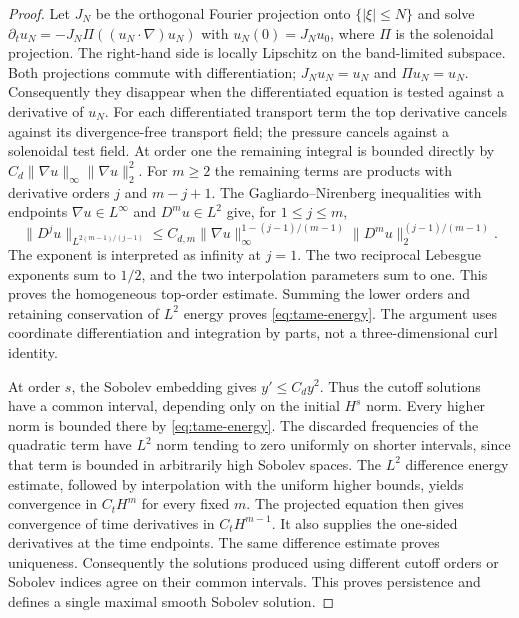 \begin{proof}
Let $J_N$ be the orthogonal Fourier projection onto $\{|\xi|\le N\}$
and solve
$\partial_tu_N=-J_N\Pi((u_N\cdot\nabla)u_N)$ with
$u_N(0)=J_Nu_0$, where $\Pi$ is the solenoidal projection.
The right-hand side is locally Lipschitz on the band-limited subspace.
Both projections commute with differentiation; $J_Nu_N=u_N$ and
$\Pi u_N=u_N$. Consequently they disappear when the differentiated
equation is tested against a derivative of $u_N$. For each differentiated
transport term the top derivative cancels against its divergence-free
transport field; the pressure cancels against a solenoidal test field.
At order one the remaining integral is bounded directly by
$C_d\|\nabla u\|_\infty\|\nabla u\|_2^2$. For $m\geq2$ the
remaining terms are products with derivative orders $j$ and $m-j+1$. The Gagliardo--Nirenberg inequalities with endpoints
$\nabla u\in L^\infty$ and $D^m u\in L^2$ give, for $1\leq j\leq m$,
\[
 \|D^j u\|_{L^{2(m-1)/(j-1)}}
 \leq C_{d,m}\|\nabla u\|_\infty^{1-(j-1)/(m-1)}
                 \|D^m u\|_2^{(j-1)/(m-1)}.
\]
The exponent is interpreted as infinity at $j=1$. The two reciprocal
Lebesgue exponents sum to $1/2$, and the two interpolation parameters
sum to one. This proves the homogeneous top-order estimate. Summing the
lower orders and retaining conservation of $L^2$ energy proves
\eqref{eq:tame-energy}. The argument uses coordinate differentiation and
integration by parts, not a three-dimensional curl identity.

At order $s$, the Sobolev embedding gives $y'\leq C_d y^2$. Thus the
cutoff solutions have a common interval, depending only on the initial
$H^s$ norm. Every higher norm is bounded there by
\eqref{eq:tame-energy}. The discarded frequencies of the quadratic term
have $L^2$ norm tending to zero uniformly on shorter intervals, since
that term is bounded in arbitrarily high Sobolev spaces. The $L^2$
difference energy estimate, followed by interpolation with the uniform
higher bounds, yields convergence in $C_tH^m$ for every fixed $m$.
The projected equation then gives convergence of time derivatives in
$C_tH^{m-1}$. It also supplies the one-sided derivatives at the time
endpoints. The same difference estimate proves uniqueness. Consequently
the solutions produced using different cutoff orders or Sobolev indices
agree on their common intervals. This proves persistence and defines a
single maximal smooth Sobolev solution.
\end{proof}

